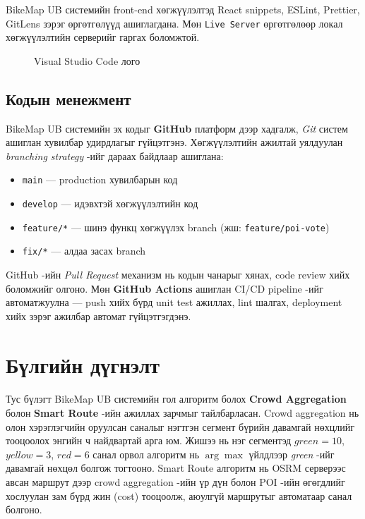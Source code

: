 \par BikeMap UB системийн front-end хөгжүүлэлтэд React snippets, ESLint, Prettier, GitLens зэрэг өргөтгөлүүд ашиглагдана. Мөн \texttt{Live Server} өргөтгөлөөр локал хөгжүүлэлтийн серверийг гаргах боломжтой.

\begin{figure}[H]
    \centering
    \caption{Visual Studio Code лого}
    \label{fig:vscode-logo}
\end{figure}

\subsection{Кодын менежмент}
\par BikeMap UB системийн эх кодыг \textbf{GitHub} платформ дээр хадгалж, \textit{Git} систем ашиглан хувилбар удирдлагыг гүйцэтгэнэ. Хөгжүүлэлтийн ажилтай уялдуулан \textit{branching strategy} -ийг дараах байдлаар ашиглана:
\begin{itemize}
    \item \texttt{main} — production хувилбарын код
    \item \texttt{develop} — идэвхтэй хөгжүүлэлтийн код
    \item \texttt{feature/*} — шинэ функц хөгжүүлэх branch (жш: \texttt{feature/poi-vote})
    \item \texttt{fix/*} — алдаа засах branch
\end{itemize}

\par GitHub -ийн \textit{Pull Request} механизм нь кодын чанарыг хянах, code review хийх боломжийг олгоно. Мөн \textbf{GitHub Actions} ашиглан CI/CD pipeline -ийг автоматжуулна — push хийх бүрд unit test ажиллах, lint шалгах, deployment хийх зэрэг ажилбар автомат гүйцэтгэгдэнэ.

\section{Бүлгийн дүгнэлт}
\paragraph{} Тус бүлэгт BikeMap UB системийн гол алгоритм болох \textbf{Crowd Aggregation} болон \textbf{Smart Route} -ийн ажиллах зарчмыг тайлбарласан. Crowd aggregation нь олон хэрэглэгчийн оруулсан саналыг нэгтгэн сегмент бүрийн давамгай нөхцлийг тооцоолох энгийн ч найдвартай арга юм. Жишээ нь нэг сегментэд $green=10$, $yellow=3$, $red=6$ санал орвол алгоритм нь $\arg\max$ үйлдлээр \emph{green} -ийг давамгай нөхцөл болгож тогтооно. Smart Route алгоритм нь OSRM серверээс авсан маршрут дээр crowd aggregation -ийн үр дүн болон POI -ийн өгөгдлийг хослуулан зам бүрд жин (cost) тооцоолж, аюулгүй маршрутыг автоматаар санал болгоно.


